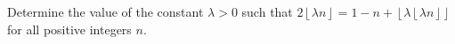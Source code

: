 Determine the value of the constant $\lambda>0$ such that $2\left\lfloor\lambda n\right\rfloor=1-n+\left\lfloor\lambda\left\lfloor\lambda n\right\rfloor\right\rfloor$ for all positive integers $n$.